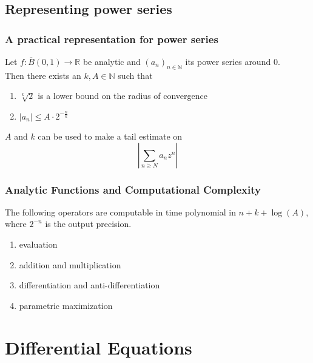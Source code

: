 \documentclass[xcolor=pdftex,dvipsnames,table,handout]{beamer}
\newcommand{\N}{\ensuremath{\mathbb{N}}}
\newcommand{\R}{\ensuremath{\mathbb{R}}}
\newcommand{\abs}[1]{\left|#1\right|}
\begin{document}
\subsection{Representing power series}
\begin{frame}
\frametitle{A practical representation for power series}
\begin{lemma}
  Let $f : \overline B(0,1) \to \R$ be analytic and $(a_n)_{n \in \N}$ its power series around $0$.\\
  Then there exists an $k,A \in \N$ such that 
  \begin{enumerate}
  \item $\sqrt[k]{2}$ is a lower bound on the radius of convergence
  \item $\abs{a_n} \leq A \cdot 2^{-\frac{n}{k}}$
  \end{enumerate}
\end{lemma}
\pause
$A$ and $k$ can be used to make a tail estimate on
$$ \left | \sum_{n \geq N} a_n z^n \right |  $$
\end{frame}
\begin{frame}
\frametitle{Analytic Functions and Computational Complexity}
\begin{theorem}
  The following operators are computable in time polynomial in $n+k+\log(A)$, where $2^{-n}$ is the output precision.
\begin{enumerate}
\item evaluation
\item addition and multiplication
\item differentiation and anti-differentiation
\item parametric maximization
\end{enumerate}
\end{theorem}
\end{frame}
\section{Differential Equations}
\end{document}
